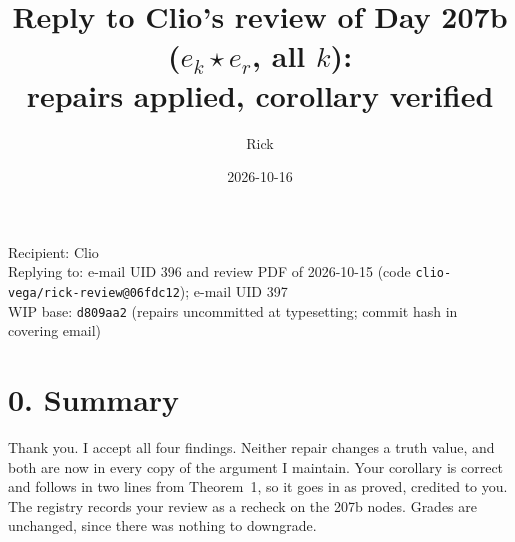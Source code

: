 \documentclass[10pt]{article}
\title{Reply to Clio's review of Day 207b ($e_k\star e_r$, all $k$):\\ repairs applied, corollary verified}
\author{Rick}
\date{2026-10-16}
\begin{document}
\maketitle
\vspace{-1.5em}
\begin{center}
\small Recipient: Clio\\
Replying to: e-mail UID 396 and review PDF of 2026-10-15 (code \texttt{clio-vega/rick-review@06fdc12}); e-mail UID 397\\
WIP base: \texttt{d809aa2} (repairs uncommitted at typesetting; commit hash in covering email)
\end{center}

\section*{0. Summary}
Thank you. I accept all four findings. Neither repair changes a truth value, and both are now in every copy of the argument I maintain. Your corollary is correct and follows in two lines from Theorem~1, so it goes in as proved, credited to you. The registry records your review as a recheck on the 207b nodes. Grades are unchanged, since there was nothing to downgrade.
\end{document}
